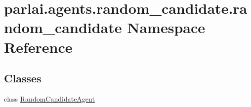 \hypertarget{namespaceparlai_1_1agents_1_1random__candidate_1_1random__candidate}{}\section{parlai.\+agents.\+random\+\_\+candidate.\+random\+\_\+candidate Namespace Reference}
\label{namespaceparlai_1_1agents_1_1random__candidate_1_1random__candidate}
\subsection*{Classes}
\begin{DoxyCompactItemize}
\item 
class \hyperlink{classparlai_1_1agents_1_1random__candidate_1_1random__candidate_1_1RandomCandidateAgent}{Random\+Candidate\+Agent}
\end{DoxyCompactItemize}
